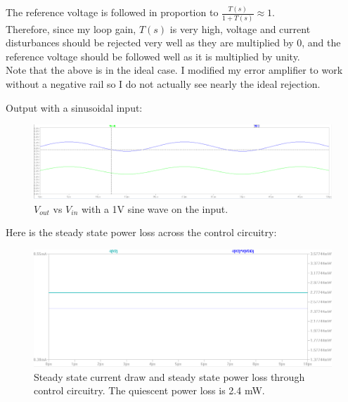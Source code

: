 \documentclass[10pt]{amsart}
\begin{document}
The reference voltage is followed in proportion to $\frac{T(s)}{1 + T(s)} \approx 1$. \\

Therefore, since my loop gain, $T(s)$ is very high, voltage and current disturbances should be rejected very well as they are multiplied by 0, and the reference voltage should be followed well as it is multiplied by unity. \\

Note that the above is in the ideal case. I modified my error amplifier to work without a negative rail so I do not actually see nearly the ideal rejection.

\newpage

Output with a sinusoidal input:

\begin{figure}[h]
	\begin{center}
		\includegraphics[width=7in]{Media/sin.png}
	\end{center}
	\caption{$V_{out} $ vs $V_{in}$ with a 1V sine wave on the input.}
	\label{fig:pidfb}
\end{figure}

Here is the steady state power loss across the control circuitry:

\begin{figure}[h]
	\begin{center}
		\includegraphics[width=7in]{Media/pwr.png}
	\end{center}
	\caption{Steady state current draw and steady state power loss through control circuitry. The quiescent power loss is 2.4 mW.}
	\label{fig:pidfb}
\end{figure}
\end{document}
